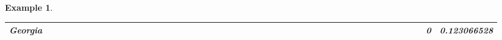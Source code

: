 \documentclass[a4paper,11pt]{report}
\newtheorem{example}[theorem]{Example}
\begin{document}
\begin{example}
\begin{appendices}
\begin{landscape}
\begin{longtable}{r|r|r|r|r|r|r|r|r|r|r|r|r|r|r|r|r|r|r|r|r|r|r|r|r|r|r|r|r|r|r|r|r|r|r|r|r|r|r|r|r|r|r|r|r|r|r|}
\multicolumn{1}{|r|}{\textbf{Georgia}}               &                                       &                                       &                                          &                                       &                                       &                                                     &                                        &                                       &                                      &                                       &                                       &                                                &                                       &                                      &                                       &                                       &                                      &                                       &                                       &                                       &                                      &                                     &                                      &                                         &                                     &                                       &                                          &                                      &                                        &                                       &                                      &                                          &                                      &                                        &                                        &                                     &                                      &                                           &                                               &                                      &                                       &                                              &                                      &                                     & 0                                             & 0.123066528                             \\ \hline

\end{longtable}
\end{landscape}
\end{appendices}
\end{example}
\end{document}
